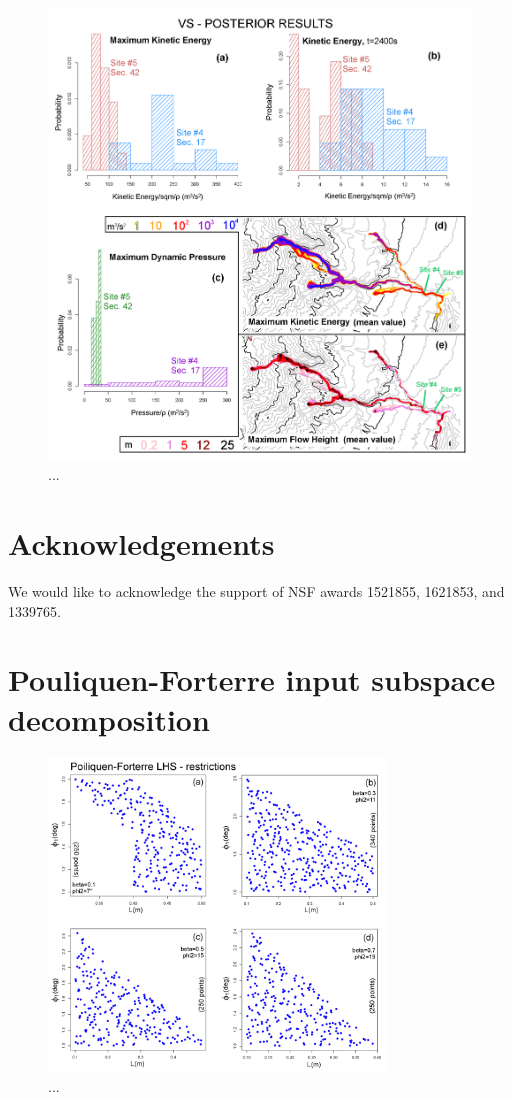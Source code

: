 \documentclass{article}
\begin{document}
\begin{figure}[H]
\centering
\includegraphics[width=1\textwidth]{Fig12.png}
\caption{...}
\label{Fig12}
\end{figure}

\section*{Acknowledgements}
We would like to acknowledge the support of NSF awards 1521855, 1621853, and 1339765.

\appendix
\section{Pouliquen-Forterre input subspace decomposition}
\begin{figure}[H]
\centering
\includegraphics[width=0.8\textwidth]{FigA1.png}
\caption{...}
\label{FigA1}
\end{figure}
\end{document}
